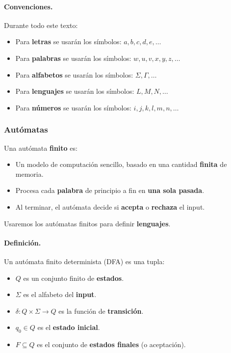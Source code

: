 \paragraph{Convenciones.} Durante todo este texto:
\begin{itemize}
    \item Para \textbf{letras} se usarán los símbolos: $a,b,c,d,e,\ldots$
    \item Para \textbf{palabras} se usarán los símbolos: $w,u,v,x,y,z,\ldots$
    \item Para \textbf{alfabetos} se usarán los símbolos: $\Sigma,\Gamma,\ldots$
    \item Para \textbf{lenguajes} se usarán los símbolos: $L,M,N,\ldots$
    \item Para \textbf{números} se usarán los símbolos: $i,j,k,l,m,n,\ldots$
\end{itemize}

\subsubsection{Autómatas}
Una autómata \textbf{finito} es:
\begin{itemize}
    \item Un modelo de computación sencillo, basado en una cantidad \textbf{finita} de memoria.
    \item Procesa cada \textbf{palabra} de principio a fin en \textbf{una sola pasada}.
    \item Al terminar, el autómata decide si \textbf{acepta} o \textbf{rechaza} el input.
\end{itemize}
Usaremos los autómatas finitos para definir \textbf{lenguajes}.

\paragraph{Definición.} Un autómata finito determinista (DFA) es una tupla:
\begin{multicols}{2}
    \begin{itemize}
        \item $Q$ es un conjunto finito de \textbf{estados}.
        \item $\Sigma$ es el alfabeto del \textbf{input}.
        \item $\delta: Q \times \Sigma\rightarrow Q$  es la función de \textbf{transición}.
        \item $q_0 \in Q$ es el \textbf{estado inicial}.
        \item $F \subseteq Q$ es el conjunto de \textbf{estados finales} (o aceptación).
    \end{itemize}
\end{multicols}

